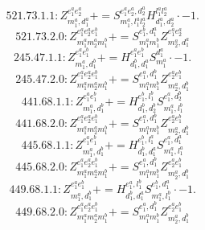 \documentclass[letterpaper,10pt,fleqn,leqno,onecolumn]{article}
\begin{document}
\begin{equation} \;\;\;\;\;\;  521.73.1.1: Z^{e_{1}^{a}e_{2}^{a}}_{m_{1}^{a},d_{1}^{a}}+=S^{e_{1}^{a}e_{2}^{a},d_{2}^{a}}_{m_{1}^{a},l_{1}^{a}l_{2}^{a}}H^{l_{1}^{a}l_{2}^{a}}_{d_{1}^{a},d_{2}^{a}}\cdot -1. \end{equation}
\begin{equation} \;\;\;\;\;\;  521.73.2.0: Z^{e_{1}^{a}e_{2}^{a}e_{1}^{b}}_{m_{1}^{a}m_{2}^{a}m_{1}^{b}}+=S^{e_{1}^{b},d_{1}^{a}}_{m_{1}^{a}m_{1}^{b}}Z^{e_{1}^{a}e_{2}^{a}}_{m_{2}^{a},d_{1}^{a}} \end{equation}
\begin{equation} \;\;\;\;\;\;  245.47.1.1: Z^{e_{1}^{a}e_{1}^{b}}_{m_{1}^{a},d_{1}^{b}}+=H^{e_{1}^{a}e_{1}^{b}}_{d_{1}^{b},d_{1}^{a}}S^{d_{1}^{a}}_{m_{1}^{a}}\cdot -1. \end{equation}
\begin{equation} \;\;\;\;\;\;  245.47.2.0: Z^{e_{1}^{a}e_{2}^{a}e_{1}^{b}}_{m_{1}^{a}m_{2}^{a}m_{1}^{b}}+=S^{e_{1}^{a},d_{1}^{b}}_{m_{1}^{a}m_{1}^{b}}Z^{e_{2}^{a}e_{1}^{b}}_{m_{2}^{a},d_{1}^{b}} \end{equation}
\begin{equation} \;\;\;\;\;\;  441.68.1.1: Z^{e_{1}^{a}e_{1}^{b}}_{m_{1}^{a},d_{1}^{b}}+=H^{e_{1}^{b},l_{1}^{b}}_{d_{1}^{b},d_{2}^{b}}S^{e_{1}^{a},d_{2}^{b}}_{m_{1}^{a},l_{1}^{b}} \end{equation}
\begin{equation} \;\;\;\;\;\;  441.68.2.0: Z^{e_{1}^{a}e_{2}^{a}e_{1}^{b}}_{m_{1}^{a}m_{2}^{a}m_{1}^{b}}+=S^{e_{1}^{a},d_{1}^{b}}_{m_{1}^{a}m_{1}^{b}}Z^{e_{2}^{a}e_{1}^{b}}_{m_{2}^{a},d_{1}^{b}} \end{equation}
\begin{equation} \;\;\;\;\;\;  445.68.1.1: Z^{e_{1}^{a}e_{1}^{b}}_{m_{1}^{a},d_{1}^{b}}+=H^{e_{1}^{b},l_{1}^{a}}_{d_{1}^{b},d_{1}^{a}}S^{e_{1}^{a},d_{1}^{a}}_{m_{1}^{a},l_{1}^{a}} \end{equation}
\begin{equation} \;\;\;\;\;\;  445.68.2.0: Z^{e_{1}^{a}e_{2}^{a}e_{1}^{b}}_{m_{1}^{a}m_{2}^{a}m_{1}^{b}}+=S^{e_{1}^{a},d_{1}^{b}}_{m_{1}^{a}m_{1}^{b}}Z^{e_{2}^{a}e_{1}^{b}}_{m_{2}^{a},d_{1}^{b}} \end{equation}
\begin{equation} \;\;\;\;\;\;  449.68.1.1: Z^{e_{1}^{a}e_{1}^{b}}_{m_{1}^{a},d_{1}^{b}}+=H^{e_{1}^{a},l_{1}^{b}}_{d_{1}^{b},d_{1}^{a}}S^{e_{1}^{b},d_{1}^{a}}_{m_{1}^{a},l_{1}^{b}}\cdot -1. \end{equation}
\begin{equation} \;\;\;\;\;\;  449.68.2.0: Z^{e_{1}^{a}e_{2}^{a}e_{1}^{b}}_{m_{1}^{a}m_{2}^{a}m_{1}^{b}}+=S^{e_{1}^{a},d_{1}^{b}}_{m_{1}^{a}m_{1}^{b}}Z^{e_{2}^{a}e_{1}^{b}}_{m_{2}^{a},d_{1}^{b}} \end{equation}
\end{document}
